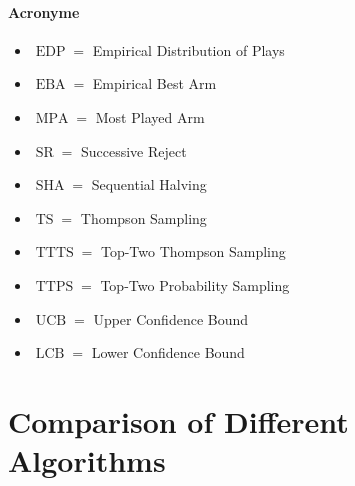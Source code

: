 \documentclass[runningheads,a4paper]{llncs}
\begin{document}
\paragraph{\bfseries{Acronyme}} 
\begin{itemize}
	\item $\operatorname{EDP} = $ Empirical Distribution of Plays
	\item $\operatorname{EBA} = $ Empirical Best Arm
	\item $\operatorname{MPA} = $ Most Played Arm
	\item $\operatorname{SR} = $ Successive Reject
	\item $\operatorname{SHA} = $ Sequential Halving
	\item $\operatorname{TS} = $ Thompson Sampling
	\item $\operatorname{TTTS} = $ Top-Two Thompson Sampling
	\item $\operatorname{TTPS} = $ Top-Two Probability Sampling
	\item $\operatorname{UCB} = $ Upper Confidence Bound
	\item $\operatorname{LCB} = $ Lower Confidence Bound
\end{itemize}

\section{Comparison of Different Algorithms}
\end{document}
